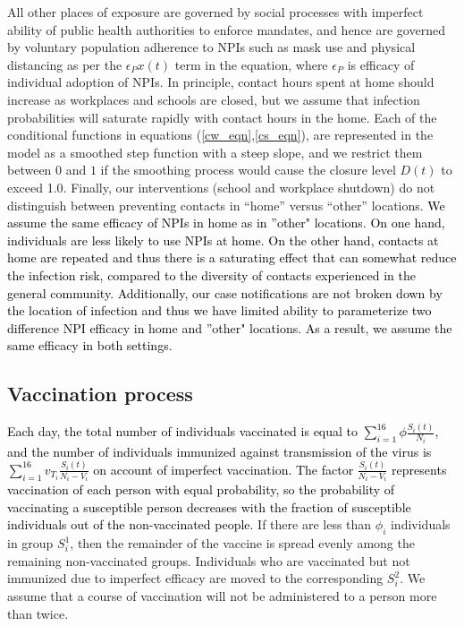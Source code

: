\documentclass[10pt,onecolumn,twoside,lineno]{pnas-new}
\begin{document}
All other places of exposure are governed by social processes with imperfect ability of public health authorities to enforce mandates, and hence are governed by voluntary population adherence to NPIs such as mask use and physical distancing as per the $\epsilon_P x(t)$ term in the equation, where $\epsilon_P$ is efficacy of individual adoption of NPIs.  In principle, contact hours spent at home should increase as workplaces and schools are closed, but we assume that infection probabilities will saturate rapidly with contact hours in the home. Each of the conditional functions in equations (\ref{cw_eqn},\ref{cs_eqn}), are represented in the model as a smoothed step function with a steep slope, and we restrict them between $0$ and $1$ if the smoothing process would cause the closure level $D(t)$ to exceed 1.0.   Finally, our interventions (school and workplace shutdown) do not distinguish between preventing contacts in “home” versus “other” locations. \textcolor{black}{We assume the same efficacy of NPIs in home as in ''other" locations.  On one hand, individuals are less likely to use NPIs at home.  On the other hand, contacts at home are repeated and thus there is a saturating effect that can somewhat reduce the infection risk, compared to the diversity of contacts experienced in the general community.  Additionally, our case notifications are not broken down by the location of infection and thus we have limited ability to parameterize two difference NPI efficacy in home and ''other" locations.  As a result, we assume the same efficacy in both settings.}

\subsection*{Vaccination process}
 \textcolor{black}{Each day, the total number of individuals vaccinated is equal to $\sum_{i = 1}^{16} \phi \frac{S_i(t)}{N_i}$, and the number of individuals immunized against transmission of the virus is $\sum_{i = 1}^{16} v_{T_i} \frac{S_i(t)}{N_i - V_i}$ on account of imperfect vaccination. The factor $\frac{S_i(t)}{N_i - V_i}$ represents vaccination of each person with equal probability, so the probability of vaccinating a susceptible person decreases with the fraction of susceptible individuals out of the non-vaccinated people.} If there are less than $\phi_i$ individuals in group $S^1_i$, then the remainder of the vaccine is spread evenly among the remaining non-vaccinated groups. Individuals who are vaccinated but not immunized due to imperfect efficacy are moved to the corresponding $S^2_i$. We assume that a course of vaccination will not be administered to a person more than twice.
\end{document}
